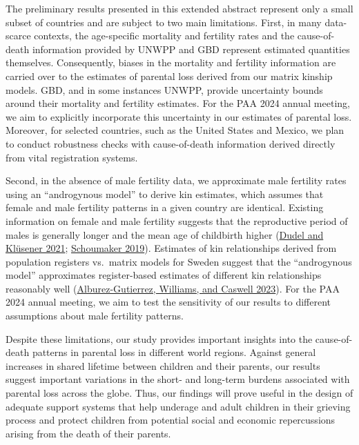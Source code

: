 \documentclass[
  11pt,
  letterpaper,
]{article}
\begin{document}
The preliminary results presented in this extended abstract represent only a small subset of countries and are subject to two main limitations. First, in many data-scarce contexts, the age-specific mortality and fertility rates and the cause-of-death information provided by UNWPP and GBD represent estimated quantities themselves. Consequently, biases in the mortality and fertility information are carried over to the estimates of parental loss derived from our matrix kinship models. GBD, and in some instances UNWPP, provide uncertainty bounds around their mortality and fertility estimates. For the PAA 2024 annual meeting, we aim to explicitly incorporate this uncertainty in our estimates of parental loss. Moreover, for selected countries, such as the United States and Mexico, we plan to conduct robustness checks with cause-of-death information derived directly from vital registration systems.

Second, in the absence of male fertility data, we approximate male fertility rates using an ``androgynous model'' to derive kin estimates, which assumes that female and male fertility patterns in a given country are identical. Existing information on female and male fertility suggests that the reproductive period of males is generally longer and the mean age of childbirth higher (\protect\hyperlink{ref-dudel2021fertility}{Dudel and Klüsener 2021}; \protect\hyperlink{ref-Schoumaker2019}{Schoumaker 2019}). Estimates of kin relationships derived from population registers vs.~matrix models for Sweden suggest that the ``androgynous model'' approximates register-based estimates of different kin relationships reasonably well (\protect\hyperlink{ref-alburez2023projections}{Alburez-Gutierrez, Williams, and Caswell 2023}). For the PAA 2024 annual meeting, we aim to test the sensitivity of our results to different assumptions about male fertility patterns.

Despite these limitations, our study provides important insights into the cause-of-death patterns in parental loss in different world regions. Against general increases in shared lifetime between children and their parents, our results suggest important variations in the short- and long-term burdens associated with parental loss across the globe. Thus, our findings will prove useful in the design of adequate support systems that help underage and adult children in their grieving process and protect children from potential social and economic repercussions arising from the death of their parents.

\newpage
\end{document}
